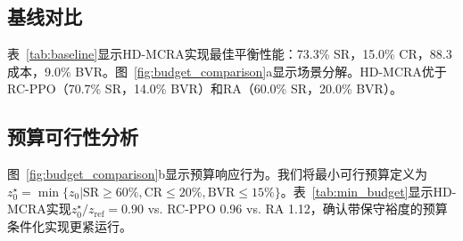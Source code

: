 \documentclass{article}
\begin{document}
\subsection{基线对比}

表~\ref{tab:baseline}显示HD-MCRA实现最佳平衡性能：73.3\% SR，15.0\% CR，88.3成本，9.0\% BVR。图~\ref{fig:budget_comparison}a显示场景分解。HD-MCRA优于RC-PPO（70.7\% SR，14.0\% BVR）和RA（60.0\% SR，20.0\% BVR）。

\begin{table}[t]
\caption{三个场景的平均性能。}
\label{tab:baseline}
\centering
{}
\end{table}

\subsection{预算可行性分析}

图~\ref{fig:budget_comparison}b显示预算响应行为。我们将最小可行预算定义为$z_0^{\star}=\min\{z_0|\text{SR}\ge60\%,\text{CR}\le20\%,\text{BVR}\le15\%\}$。表~\ref{tab:min_budget}显示HD-MCRA实现$z_0^{\star}/z_{\mathrm{ref}}=0.90$ vs. RC-PPO 0.96 vs. RA 1.12，确认带保守裕度的预算条件化实现更紧运行。

\begin{table}[t]
\caption{最小可行归一化初始预算。}
\label{tab:min_budget}
\centering
{}
\end{table}
\end{document}
